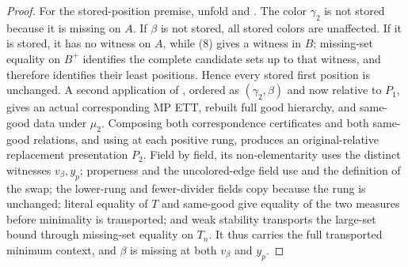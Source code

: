 \begin{proof}
For the stored-position premise, unfold
 and
.  The color \(\gamma_2\) is not
stored because it is missing on \(A\).  If \(\beta\) is not stored, all
stored colors are unaffected.  If it is stored, it has no witness on
\(A\), while (8) gives a witness in \(B\); missing-set equality on
\(B^+\) identifies the complete candidate sets up to that witness, and
therefore identifies their least positions.  Hence every stored
first position is unchanged.  A second application of
, ordered as
\((\gamma_2,\beta)\) and now relative to \(P_1\),
gives an actual corresponding MP ETT, rebuilt full good hierarchy, and
same-good data under \(\mu_2\).  Composing both correspondence
certificates and both same-good relations, and using  at
each positive rung, produces an original-relative replacement
presentation \(P_2\).  Field by field, its non-elementarity uses the
distinct witnesses \(v_\beta,y_p\); properness and the uncolored-edge
field use  and the definition of
the swap; the lower-rung and fewer-divider fields copy because the rung
is unchanged; literal equality of \(T\) and same-good give equality of
the two measures before minimality is transported; and weak stability
transports the large-set bound through missing-set equality on \(T_n\).
It thus carries the full transported minimum context, and \(\beta\) is
missing at both \(v_\beta\) and \(y_p\).


\end{proof}
